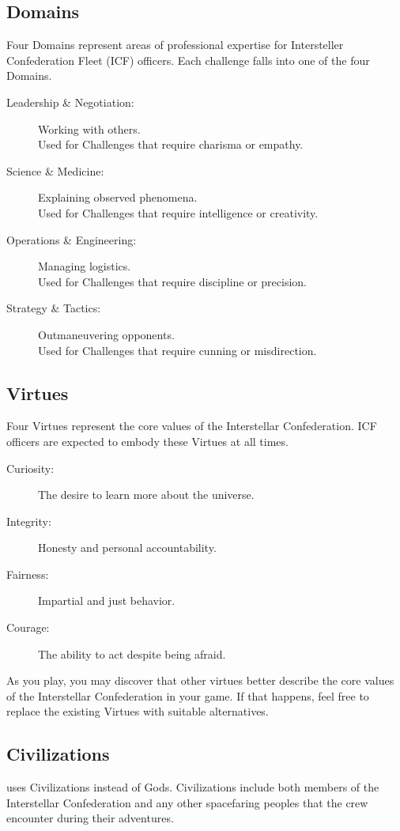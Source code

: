 \documentclass[11pt, a5paper, parskip=half-, DIV=12]{scrartcl}
\begin{document}
\newpage

\subsection*{Domains}
Four Domains represent areas of professional expertise for Intersteller Confederation Fleet (ICF) officers. Each challenge falls into one of the four Domains.
\begin{description}
	\item[Leadership \& Negotiation:] Working with others.\\Used for Challenges that require charisma or empathy.
	\item[Science \& Medicine:] Explaining observed phenomena.\\Used for Challenges that require intelligence or creativity.
	\item[Operations \& Engineering:] Managing logistics.\\Used for Challenges that require discipline or precision.
	\item[Strategy \& Tactics:] Outmaneuvering opponents.\\Used for Challenges that require cunning or misdirection.
\end{description}

\subsection*{Virtues}
Four Virtues represent the core values of the Interstellar Confederation. ICF officers are expected to embody these Virtues at all times.
\begin{description}
	\item[Curiosity:] The desire to learn more about the universe.
	\item[Integrity:] Honesty and personal accountability.
	\item[Fairness:] Impartial and just behavior.
	\item[Courage:] The ability to act despite being afraid.
\end{description}
As you play, you may discover that other virtues better describe the core values of the Interstellar Confederation in your game.  If that happens, feel free to replace the existing Virtues with suitable alternatives.

\newpage

\subsection*{Civilizations}
\ENDEAVOUR{} uses Civilizations instead of Gods.  Civilizations include both members of the Interstellar Confederation and any other spacefaring peoples that the crew encounter during their adventures.
\end{document}
